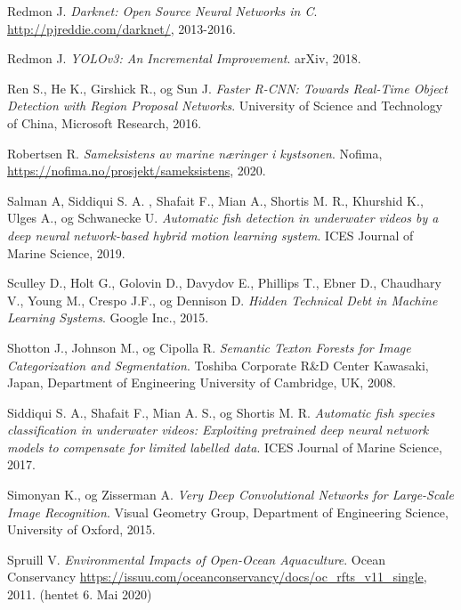\documentclass[11ot]{article}
\begin{document}
\begin{thebibliography}{9}
Redmon J. 
\textit{Darknet: Open Source Neural Networks in C}. 
\url{http://pjreddie.com/darknet/}, 2013-2016.

Redmon J. 
\textit{YOLOv3: An Incremental Improvement}. 
arXiv, 2018.

Ren S., He K., Girshick R., og Sun J.
\textit{Faster R-CNN: Towards Real-Time Object Detection with Region Proposal Networks}. 
University of Science and Technology of China, Microsoft Research, 2016.

Robertsen R. 
\textit{Sameksistens av marine næringer i kystsonen}. 
Nofima, \url{https://nofima.no/prosjekt/sameksistens}, 2020.

Salman A, Siddiqui S. A. , Shafait F., Mian A., Shortis M. R., Khurshid K., Ulges A., og Schwanecke U. 
\textit{Automatic fish detection in underwater videos by a deep neural network-based hybrid motion learning system}. 
ICES Journal of Marine Science, 2019.

Sculley D., Holt G., Golovin D., Davydov E., Phillips T., Ebner D., Chaudhary V., Young M., Crespo J.F., og Dennison D. 
\textit{Hidden Technical Debt in Machine Learning Systems}. 
Google Inc., 2015.


Shotton J., Johnson M., og Cipolla R. 
\textit{Semantic Texton Forests for Image Categorization and Segmentation}. 
Toshiba Corporate R\&D Center Kawasaki, Japan, Department of Engineering University of Cambridge, UK, 2008.

Siddiqui S. A., Shafait F., Mian A. S., og Shortis M. R. 
\textit{Automatic fish species classification in underwater videos: Exploiting pretrained deep neural network models to compensate for limited labelled data}. 
ICES Journal of Marine Science, 2017.

Simonyan K., og Zisserman A. 
\textit{Very Deep Convolutional Networks for Large-Scale Image Recognition}. 
Visual Geometry Group, Department of Engineering Science, University of Oxford, 2015.

Spruill V.
\textit{Environmental Impacts of Open-Ocean Aquaculture}. 
Ocean Conservancy \url{https://issuu.com/oceanconservancy/docs/oc_rfts_v11_single}, 2011. (hentet 6. Mai 2020)


\end{thebibliography}
\end{document}
